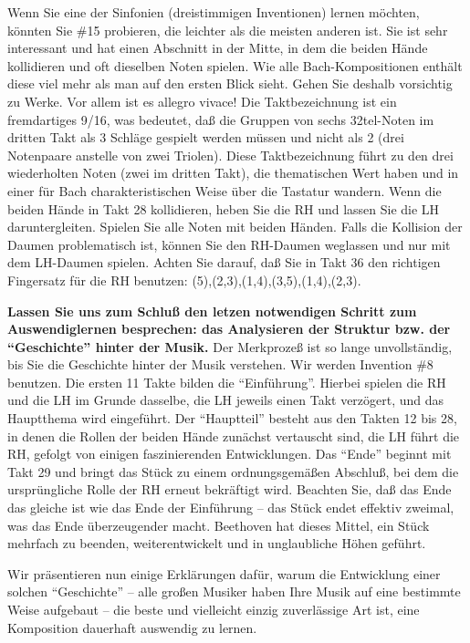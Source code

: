 Wenn Sie eine der Sinfonien (dreistimmigen Inventionen) lernen möchten, könnten Sie \#15 probieren, die leichter als die meisten anderen ist.
Sie ist sehr interessant und hat einen Abschnitt in der Mitte, in dem die beiden Hände kollidieren und oft dieselben Noten spielen.
Wie alle Bach-Kompositionen enthält diese viel mehr als man auf den ersten Blick sieht.
Gehen Sie deshalb vorsichtig zu Werke.
Vor allem ist es allegro vivace!
Die Taktbezeichnung ist ein fremdartiges 9/16, was bedeutet, daß die Gruppen von sechs 32tel-Noten im dritten Takt als 3 Schläge gespielt werden müssen und nicht als 2 (drei Notenpaare anstelle von zwei Triolen).
Diese Taktbezeichnung führt zu den drei wiederholten Noten (zwei im dritten Takt), die thematischen Wert haben und in einer für Bach charakteristischen Weise über die Tastatur wandern.
Wenn die beiden Hände in Takt 28 kollidieren, heben Sie die RH und lassen Sie die LH daruntergleiten.
Spielen Sie alle Noten mit beiden Händen.
Falls die Kollision der Daumen problematisch ist, können Sie den RH-Daumen weglassen und nur mit dem LH-Daumen spielen.
Achten Sie darauf, daß Sie in Takt 36 den richtigen Fingersatz für die RH benutzen: (5),(2,3),(1,4),(3,5),(1,4),(2,3).

\textbf{Lassen Sie uns zum Schluß den letzen notwendigen Schritt zum Auswendiglernen besprechen: das Analysieren der Struktur bzw. der \enquote{Geschichte} hinter der Musik.}
Der Merkprozeß ist so lange unvollständig, bis Sie die Geschichte hinter der Musik verstehen.
Wir werden Invention \#8 benutzen.
Die ersten 11 Takte bilden die \enquote{Einführung}.
Hierbei spielen die RH und die LH im Grunde dasselbe, die LH jeweils einen Takt verzögert, und das Hauptthema wird eingeführt.
Der \enquote{Hauptteil} besteht aus den Takten 12 bis 28, in denen die Rollen der beiden Hände zunächst vertauscht sind, die LH führt die RH, gefolgt von einigen faszinierenden Entwicklungen.
Das \enquote{Ende} beginnt mit Takt 29 und bringt das Stück zu einem ordnungsgemäßen Abschluß, bei dem die ursprüngliche Rolle der RH erneut bekräftigt wird.
Beachten Sie, daß das Ende das gleiche ist wie das Ende der Einführung -- das Stück endet effektiv zweimal, was das Ende überzeugender macht.
Beethoven hat dieses Mittel, ein Stück mehrfach zu beenden, weiterentwickelt und in unglaubliche Höhen geführt.

Wir präsentieren nun einige Erklärungen dafür, warum die Entwicklung einer solchen \enquote{Geschichte} -- alle großen Musiker haben Ihre Musik auf eine bestimmte Weise aufgebaut -- die beste und vielleicht einzig zuverlässige Art ist, eine Komposition dauerhaft auswendig zu lernen.



